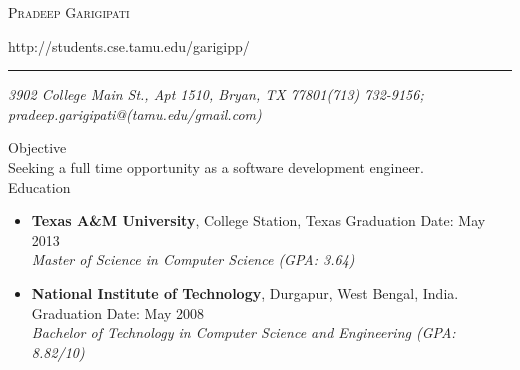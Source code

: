 \documentclass[11pt,oneside]{article}
\makeatletter
\newcommand{\name}{Pradeep Garigipati}
\newcommand{\addr}{3902 College Main St., Apt 1510, Bryan, TX 77801}
\newcommand{\phone}{(713) 732-9156}
\newcommand{\email}{pradeep.garigipati@(tamu.edu/gmail.com)}
\newcommand{\web}{http://students.cse.tamu.edu/garigipp/}
\newcommand{\bigname}[1]{
  \begin{center}\fontfamily{phv}\selectfont\Huge\scshape#1\end{center}
}
\newenvironment{ressection}[1]{
  \vspace{4pt}
  {\fontfamily{phv}\selectfont\Large#1}
  \begin{itemize}
  \vspace{3pt}
}{
  \end{itemize}
}
\newcommand{\ressubitem}[1]{
  \vspace{-1pt}
  \item \begin{flushleft} #1 \end{flushleft}
}
\newcommand{\resbigitem}[4]{
  \vspace{-5pt}
  \item
  \textbf{#1}, #2 \hfill #4\\
  \textit{#3}
}
\newenvironment{ressubsec}[4]{
  \resbigitem{#1}{#2}{#3}{#4}
  \vspace{-2pt}
  \begin{itemize}
}{
  \end{itemize}
}
\newenvironment{ressubsec2}[4]{
  \resbigitem{#1}{#2}{#3}{#4}
}
\makeatother
\begin{document}
 \selectfont
\bigname{\name}  
\begin{center} \web \end{center}
\vspace{-8pt} \rule{\textwidth}{1pt}
\vspace{-1pt} {\small\itshape \addr \hfill \phone; \email}
\vspace{8 pt}

{\selectfont\Large Objective}\\
Seeking a full time opportunity as a software development engineer.\\

\begin{ressection}{Education}
  \begin{ressubsec2}{Texas A\&M University}{College Station, Texas}{Master of Science in Computer Science (GPA: 3.64)}{Graduation Date: May 2013}
    \end{ressubsec2}
  \begin{ressubsec2}{National Institute of Technology}{Durgapur, West Bengal, India.}{Bachelor of Technology in Computer Science and Engineering (GPA: 8.82/10)}{Graduation Date: May 2008}
  \end{ressubsec2}
\end{ressection}
\end{document}
